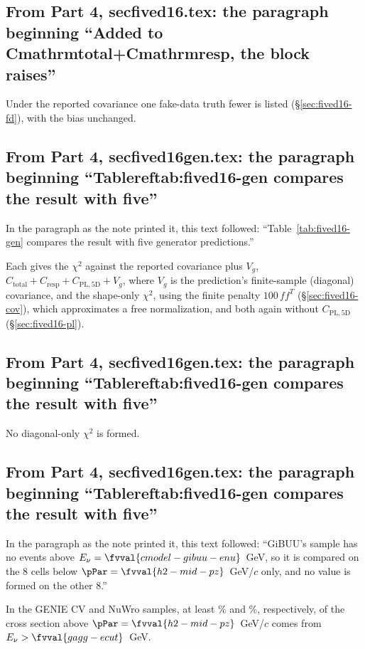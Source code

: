 \subsection{From Part 4, secfived16.tex: the paragraph beginning ``Added to Cmathrmtotal+Cmathrmresp, the block raises''}
Under the reported covariance one fake-data truth fewer is listed (\S\ref{sec:fived16-fd}), with the bias unchanged.

\subsection{From Part 4, secfived16gen.tex: the paragraph beginning ``Tablereftab:fived16-gen compares the result with five''}
In the paragraph as the note printed it, this text followed: ``Table~\ref{tab:fived16-gen} compares the result with five generator predictions.''\par
Each gives the $\chi^2$ against the reported covariance plus $V_g$, $C_{\mathrm{total}}+C_{\mathrm{resp}}+C_{\mathrm{PL,5D}}+V_g$, where $V_g$ is the prediction's finite-sample (diagonal) covariance, and the shape-only $\chi^{2}$, using the finite penalty $100\,f f^{T}$ (\S\ref{sec:fived16-cov}), which approximates a free normalization, and both again without $C_{\mathrm{PL,5D}}$ (\S\ref{sec:fived16-pl}).

\subsection{From Part 4, secfived16gen.tex: the paragraph beginning ``Tablereftab:fived16-gen compares the result with five''}
No diagonal-only $\chi^2$ is formed.

\subsection{From Part 4, secfived16gen.tex: the paragraph beginning ``Tablereftab:fived16-gen compares the result with five''}
In the paragraph as the note printed it, this text followed: ``GiBUU's sample has no events above $E_\nu=\fvval{cmodel-gibuu-enu}$~GeV, so it is compared on the 8 cells below $\pPar=\fvval{h2-mid-pz}$~GeV/$c$ only, and no value is formed on the other 8.''\par
In the GENIE CV and NuWro samples, at least \% and \%, respectively, of the cross section above $\pPar=\fvval{h2-mid-pz}$~GeV/$c$ comes from $E_\nu>\fvval{gagg-ecut}$~GeV.

